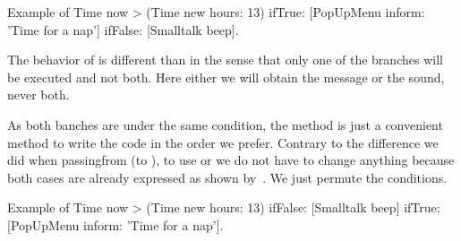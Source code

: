 \begin{scriptwithtitle}{Example of }\label{scr:iftruefalseExample}
Time now > (Time new hours: 13)
   ifTrue: [PopUpMenu inform: 'Time for a nap']
   ifFalse: [Smalltalk beep]. 
\end{scriptwithtitle}

The behavior of  is different than  in the sense that only one of the branches will be executed and not both. Here either we will obtain the message or the sound, never both.


As both banches are under the same condition, the method  is just a convenient method
to write the code in the order we prefer. Contrary to the difference we did when passingfrom  (to  ), to use  or  we do not have to change anything because both cases are already expressed as shown by~. We just permute the conditions.

\begin{scriptwithtitle}{Example of }\label{scr:falseiftrueExample}
Time now > (Time new hours: 13)
   ifFalse: [Smalltalk beep]
   ifTrue: [PopUpMenu inform: 'Time for a nap']. 
\end{scriptwithtitle}
